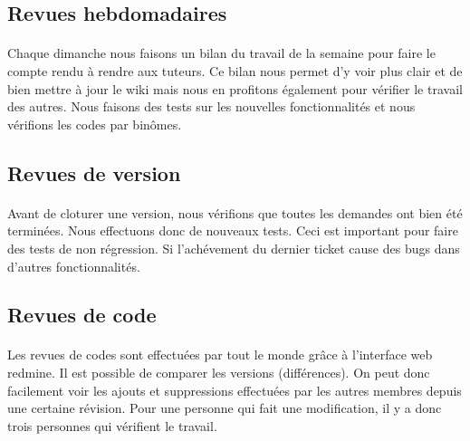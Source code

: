 \subsection{Revues hebdomadaires}

\paragraph{}
Chaque dimanche nous faisons un bilan du travail de la semaine pour faire le compte rendu à rendre aux tuteurs. Ce bilan nous permet d'y voir plus clair et de bien mettre à jour le wiki mais nous en profitons également pour vérifier le travail des autres. Nous faisons des tests sur les nouvelles fonctionnalités et nous vérifions les codes par binômes.

\subsection{Revues de version}

\paragraph{}
Avant de cloturer une version, nous vérifions que toutes les demandes ont bien été terminées. Nous effectuons donc de nouveaux tests. Ceci est important pour faire des tests de non régression. Si l'achévement du dernier ticket cause des bugs dans d'autres fonctionnalités.

\subsection{Revues de code}

\paragraph{}
Les revues de codes sont effectuées par tout le monde grâce à l'interface web redmine. Il est possible de comparer les versions (différences). On peut donc facilement voir les ajouts et suppressions effectuées par les autres membres depuis une certaine révision. Pour une personne qui fait une modification, il y a donc trois personnes qui vérifient le travail.